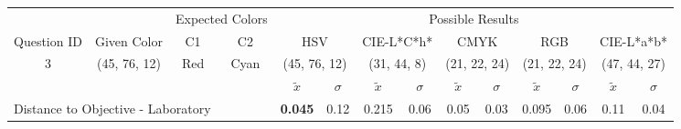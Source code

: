\begin{table}[H]
  \resizebox{\textwidth}{!} {
  \begin{tabular}{lccccccccccccc}
    \hline
    \multicolumn{1}{c}{}                              &                                      & \multicolumn{2}{c}{Expected Colors}                   & \multicolumn{10}{c}{Possible Results}                                                                                                                                                                                                                                                                                        \\ \cline{3-14}
    \multicolumn{1}{c}{\multirow{-2}{*}{Question ID}} & \multirow{-2}{*}{Given Color}        & C1                       & C2                         & \multicolumn{2}{c}{HSV}                                        & \multicolumn{2}{c}{CIE-L*C*h*}                                 & \multicolumn{2}{c}{CMYK}                                       & \multicolumn{2}{c}{RGB}                                        & \multicolumn{2}{c}{CIE-L*a*b*}                                 \\ \hline
    \multicolumn{1}{c}{3}                             & \cellcolor[HTML]{80FF00}(45, 76, 12) & \multicolumn{1}{c|}{Red} & \multicolumn{1}{c|}{Cyan}  & \multicolumn{2}{c|}{\cellcolor[HTML]{80FF00}(45, 76, 12)}      & \multicolumn{2}{c|}{\cellcolor[HTML]{91C01D}(31, 44, 8)}       & \multicolumn{2}{c|}{\cellcolor[HTML]{808080}(21, 22, 24)}       & \multicolumn{2}{c|}{\cellcolor[HTML]{808080}(21, 22, 24)}       & \multicolumn{2}{c|}{\cellcolor[HTML]{DDA581}(47, 44, 27)}       \\ \hline
                                                      & \multicolumn{1}{l}{}                 & \multicolumn{1}{l}{}     & \multicolumn{1}{l}{}       & \multicolumn{1}{c}{$\tilde{x}$} & \multicolumn{1}{c}{$\sigma$} & \multicolumn{1}{c}{$\tilde{x}$} & \multicolumn{1}{c}{$\sigma$} & \multicolumn{1}{c}{$\tilde{x}$} & \multicolumn{1}{c}{$\sigma$} & \multicolumn{1}{c}{$\tilde{x}$} & \multicolumn{1}{c}{$\sigma$} & \multicolumn{1}{c}{$\tilde{x}$} & \multicolumn{1}{c}{$\sigma$} \\ \hline
    \multicolumn{4}{l}{Distance to Objective - Laboratory}                                                                                           & \multicolumn{1}{|c}{\textbf{0.045}}       & \multicolumn{1}{c|}{0.12}    & \multicolumn{1}{|c}{0.215}       & \multicolumn{1}{c|}{0.06}    & \multicolumn{1}{|c}{0.05}       & \multicolumn{1}{c|}{0.03}    & \multicolumn{1}{|c}{0.095}       & \multicolumn{1}{c|}{0.06}    & \multicolumn{1}{|c}{0.11}       & \multicolumn{1}{c|}{0.04}    \\

\end{tabular}}
\end{table}
